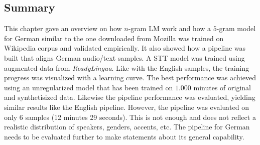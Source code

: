 \subsection{Summary}

This chapter gave an overview on how $n$-gram \ac{LM} work and how a $5$-gram model for German similar to the one downloaded from Mozilla was trained on Wikipedia corpus and validated empirically. It also showed how a pipeline was built that aligns German audio/text samples. A \ac{STT} model was trained using augmented data from \textit{ReadyLingua}. Like with the English samples, the training progress was visualized with a learning curve. The best performance was achieved using an unregularized model that has been trained on $1.000$ minutes of original and synthetisized data. Likewise the pipeline performance was evaluated, yielding similar results like the English pipeline. However, the pipeline was evaluated on only 6 samples (12 minutes 29 seconds). This is not enough and does not reflect a realistic distribution of speakers, genders, accents, etc. The pipeline for German needs to be evaluated further to make statements about its general capability.